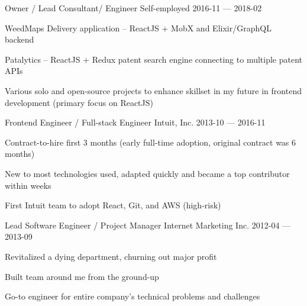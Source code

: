 \begin{cventries}
  \cventry
    {Owner / Lead Consultant/ Engineer} %
    {Self-employed} %
    {} %
    {2016-11 — 2018-02} %
    {
      \begin{cvitems} %
        \item {WeedMaps Delivery application -- ReactJS + MobX and Elixir/GraphQL backend}
        \item {Patalytics -- ReactJS + Redux patent search engine connecting to multiple patent APIs}
        \item {Various solo and open-source projects to enhance skillset in my future in frontend development (primary focus on ReactJS)}
      \end{cvitems}
    }


  \cventry
    {Frontend Engineer / Full-stack Engineer} %
    {Intuit, Inc.} %
    {} %
    {2013-10 — 2016-11} %
    {
      \begin{cvitems} %
        \item {Contract-to-hire first 3 months (early full-time adoption, original contract was 6 months)}
        \item {New to most technologies used, adapted quickly and became a top contributor within weeks}
        \item {First Intuit team to adopt React, Git, and AWS (high-risk)}
      \end{cvitems}
    }


  \cventry
    {Lead Software Engineer / Project Manager} %
    {Internet Marketing Inc.} %
    {} %
    {2012-04 — 2013-09} %
    {
      \begin{cvitems} %
        \item {Revitalized a dying department, churning out major profit}
        \item {Built team around me from the ground-up}
        \item {Go-to engineer for entire company's technical problems and challenges}
      \end{cvitems}
    }



\end{cventries}
